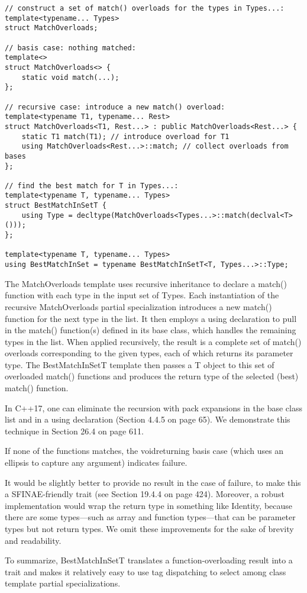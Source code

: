 \begin{lstlisting}[style=styleCXX]
// construct a set of match() overloads for the types in Types...:
template<typename... Types>
struct MatchOverloads;

// basis case: nothing matched:
template<>
struct MatchOverloads<> {
	static void match(...);
};

// recursive case: introduce a new match() overload:
template<typename T1, typename... Rest>
struct MatchOverloads<T1, Rest...> : public MatchOverloads<Rest...> {
	static T1 match(T1); // introduce overload for T1
	using MatchOverloads<Rest...>::match; // collect overloads from bases
};

// find the best match for T in Types...:
template<typename T, typename... Types>
struct BestMatchInSetT {
	using Type = decltype(MatchOverloads<Types...>::match(declval<T>()));
};

template<typename T, typename... Types>
using BestMatchInSet = typename BestMatchInSetT<T, Types...>::Type;
\end{lstlisting}

The MatchOverloads template uses recursive inheritance to declare a match() function with each type in the input set of Types. Each instantiation of the recursive MatchOverloads partial specialization introduces a new match() function for the next type in the list. It then employs a using declaration to pull in the match() function(s) defined in its base class, which handles the remaining types in the list. When applied recursively, the result is a complete set of match() overloads corresponding to the given types, each of which returns its parameter type. The BestMatchInSetT template then passes a T object to this set of overloaded match() functions and produces the return type of the selected (best) match() function.

\begin{tcolorbox}[colback=webgreen!5!white,colframe=webgreen!75!black]
\hspace*{0.75cm}In C++17, one can eliminate the recursion with pack expansions in the base class list and in a using declaration (Section 4.4.5 on page 65). We demonstrate this technique in Section 26.4 on page 611.
\end{tcolorbox}

If none of the functions matches, the voidreturning basis case (which uses an ellipsis to capture any argument) indicates failure.

\begin{tcolorbox}[colback=webgreen!5!white,colframe=webgreen!75!black]
\hspace*{0.75cm}It would be slightly better to provide no result in the case of failure, to make this a SFINAE-friendly trait (see Section 19.4.4 on page 424). Moreover, a robust implementation would wrap the return type in something like Identity, because there are some types—such as array and function types—that can be parameter types but not return types. We omit these improvements for the sake of brevity and readability.
\end{tcolorbox}

To summarize, BestMatchInSetT translates a function-overloading result into a trait and makes it relatively easy to use tag dispatching to select among class template partial specializations.










